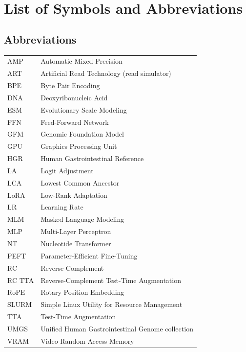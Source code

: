 
\chapter*{List of Symbols and Abbreviations}

\section*{Abbreviations}

\begin{longtable}{ll}
    AMP     & Automatic Mixed Precision \\
    ART     & Artificial Read Technology (read simulator) \\
    BPE     & Byte Pair Encoding \\
    DNA     & Deoxyribonucleic Acid \\
    ESM     & Evolutionary Scale Modeling \\
    FFN     & Feed-Forward Network \\
    GFM     & Genomic Foundation Model \\
    GPU     & Graphics Processing Unit \\
    HGR     & Human Gastrointestinal Reference \\
    LA      & Logit Adjustment \\
    LCA     & Lowest Common Ancestor \\
    LoRA    & Low-Rank Adaptation \\
    LR      & Learning Rate \\
    MLM     & Masked Language Modeling \\
    MLP     & Multi-Layer Perceptron \\
    NT      & Nucleotide Transformer \\
    PEFT    & Parameter-Efficient Fine-Tuning \\
    RC      & Reverse Complement \\
    RC TTA  & Reverse-Complement Test-Time Augmentation \\
    RoPE    & Rotary Position Embedding \\
    SLURM   & Simple Linux Utility for Resource Management \\
    TTA     & Test-Time Augmentation \\
    UMGS    & Unified Human Gastrointestinal Genome collection \\
    VRAM    & Video Random Access Memory \\
\end{longtable}

